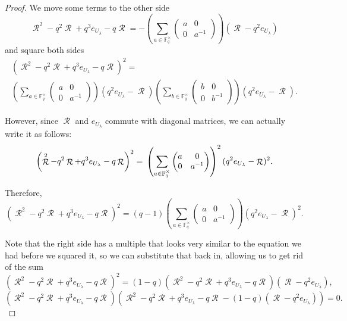 \documentclass[10pt,a4paper]{amsart}
\DeclareMathOperator{\R}{\mathcal{R}}
\begin{document}
\begin{proof}
We move some terms to the other side
\begin{equation*}
    \R^2 -  q^2 \R + q^3 e_{U_{\lambda}} - q \R  = -\left(  \sum_{a \in \mathbb{F}_q^\times} \begin{pmatrix}
    a & 0 \\
    0 & a^{-1}
    \end{pmatrix} \right) ( \R - q^2 e_{U_{\lambda}})
\end{equation*}
and square both sides
\begin{multline*}
    \left(\R^2 -  q^2 \R + q^3 e_{U_{\lambda}} - q \R\right)^2 =\\
    \left(  \sum_{a \in \mathbb{F}_q^\times} \begin{pmatrix}
    a & 0 \\
    0 & a^{-1}
    \end{pmatrix} \right) (q^2 e_{U_{\lambda}} - \R) \left(  \sum_{b \in \mathbb{F}_q^\times} \begin{pmatrix}
    b & 0 \\
    0 & b^{-1}
    \end{pmatrix} \right) ( q^2 e_{U_{\lambda}} - \R).
\end{multline*}

However, since $\R$ and $e_{U_{\lambda}}$ commute with diagonal matrices, we can actually write it as follows:
\begin{equation*}
    \left(\R^2 -  q^2 \R + q^3 e_{U_{\lambda}} - q \R\right)^2 =\\
    \left(  \sum_{a \in \mathbb{F}_q^\times} \begin{pmatrix}
    a & 0 \\
    0 & a^{-1}
    \end{pmatrix} \right)^2 ( q^2 e_{U_{\lambda}} - \R)^2.
\end{equation*}

Therefore,
\begin{equation*}
    \left(\R^2 -  q^2 \R + q^3 e_{U_{\lambda}} - q \R\right)^2 =
    (q-1) \left(  \sum_{a \in \mathbb{F}_q^\times} \begin{pmatrix}
    a & 0 \\
    0 & a^{-1}
    \end{pmatrix} \right) ( q^2 e_{U_{\lambda}} - \R)^2.
\end{equation*}

Note that the right side has a multiple that looks very similar to the equation we had before we squared it, so we can substitute that back in, allowing us to get rid of the sum
\begin{equation*}
    \left(\R^2 -  q^2 \R + q^3 e_{U_{\lambda}} - q \R\right)^2 =
    (1-q) \left(\R^2 -  q^2 \R + q^3 e_{U_{\lambda}} - q \R\right) ( \R - q^2e_{U_{\lambda}} ),
\end{equation*}
\begin{equation*}
    \left(\R^2 -  q^2 \R + q^3 e_{U_{\lambda}} - q \R\right)
    \left(\R^2 -  q^2 \R + q^3 e_{U_{\lambda}} - q \R-(1-q)(\R - q^2e_{U_{\lambda}})\right) = 0.
\end{equation*}


\end{proof}
\end{document}
